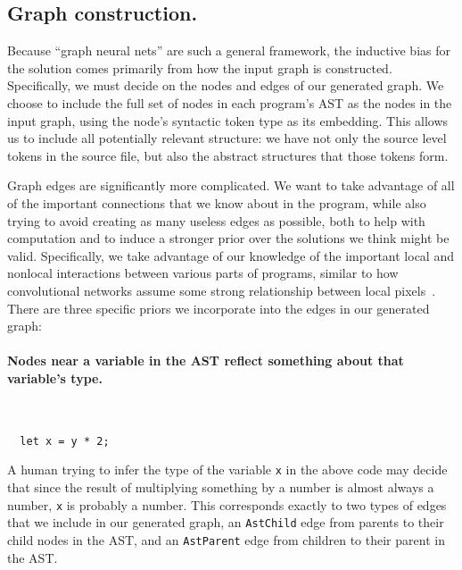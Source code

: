 \subsection{Graph construction.}
\label{sec:graph-neural-net}
Because ``graph neural nets'' are such a general framework, the inductive bias for the solution comes primarily from how the input graph is constructed.
Specifically, we must decide on the nodes and edges of our generated graph.
We choose to include the full set of nodes in each program's AST as the nodes in the input graph, using the node's syntactic token type as its embedding.
This allows us to include all potentially relevant structure: we have not only the source level tokens in the source file, but also the abstract structures that those tokens form.

Graph edges are significantly more complicated.
We want to take advantage of all of the important connections that we know about in the program, while also trying to avoid creating as many useless edges as possible, both to help with computation and to induce a stronger prior over the solutions we think might be valid.
Specifically, we take advantage of our knowledge of the important local and nonlocal interactions between various parts of programs, similar to how convolutional networks assume some strong relationship between local pixels~\cite{henaff2015deep}.
There are three specific priors we incorporate into the edges in our generated graph:

\paragraph{Nodes near a variable in the AST reflect something about that variable's type.}\
\ %
\begin{lstlisting}
  let x = y * 2;
\end{lstlisting}
A human trying to infer the type of the variable \texttt{x} in the above code may decide that since the result of multiplying something by a number is almost always a number, \texttt{x} is probably a number.
This corresponds exactly to two types of edges that we include in our generated graph, an \texttt{AstChild} edge from parents to their child nodes in the AST, and an \texttt{AstParent} edge from children to their parent in the AST.

